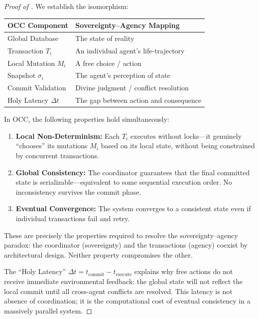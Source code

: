 \documentclass[12pt, a4paper]{article}
\theoremstyle{plain}
\theoremstyle{definition}
\begin{document}
\begin{proof}[Proof of ]
  We establish the isomorphism:
  \begin{center}
  \begin{tabular}{ll}
    \toprule
    \textbf{OCC Component} & \textbf{Sovereignty--Agency Mapping} \\
    \midrule
    Global Database & The state of reality \\
    Transaction $T_i$ & An individual agent's life-trajectory \\
    Local Mutation $M_i$ & A free choice / action \\
    Snapshot $\sigma_i$ & The agent's perception of state \\
    Commit Validation & Divine judgment / conflict resolution \\
    Holy Latency $\Delta t$ & The gap between action and consequence \\
    \bottomrule
  \end{tabular}
  \end{center}

  In OCC, the following properties hold simultaneously:
  \begin{enumerate}[label=(\roman*)]
    \item \textbf{Local Non-Determinism:} Each $T_i$ executes without
      locks---it genuinely ``chooses'' its mutations $M_i$ based on its
      local state, without being constrained by concurrent transactions.
    \item \textbf{Global Consistency:} The coordinator guarantees that the
      final committed state is serializable---equivalent to some sequential
      execution order. No inconsistency survives the commit phase.
    \item \textbf{Eventual Convergence:} The system converges to a consistent
      state even if individual transactions fail and retry.
  \end{enumerate}

  These are precisely the properties required to resolve the sovereignty--agency
  paradox: the coordinator (sovereignty) and the transactions (agency) coexist
  by architectural design. Neither property compromises the other.

  The ``Holy Latency'' $\Delta t = t_{\text{commit}} - t_{\text{execute}}$
  explains why free actions do not receive immediate environmental feedback:
  the global state will not reflect the local commit until all cross-agent
  conflicts are resolved. This latency is not absence of coordination; it
  is the computational cost of eventual consistency in a massively parallel
  system. \qedhere
\end{proof}
\end{document}
